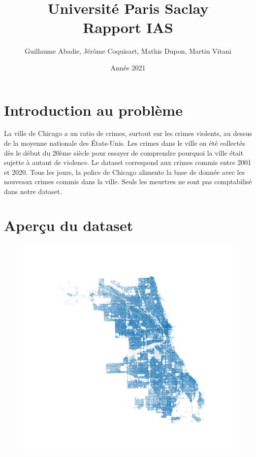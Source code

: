 \documentclass{article}
\title{\textbf{\Huge  Université Paris Saclay}\\ Rapport IAS}
\author{Guillaume Abadie, Jérôme Coquisart, Mathis Dupon, Martin Vitani}
\date{Année 2021}
\begin{document}
    \maketitle
    \tableofcontents
    \newpage


    \section{Introduction au problème}
    La ville de Chicago a un ratio de crimes, surtout sur les crimes violents, au dessus de la moyenne
    nationale des États-Unis.
    Les crimes dans le ville on été collectés dès le début du 20ème siècle pour essayer de 
    comprendre pourquoi la ville était sujette à autant de violence.
    Le dataset correspond aux crimes commis entre 2001 et 2020.
    Tous les jours, la police de Chicago alimente la base de donnée avec les nouveaux crimes commis
    dans la ville. Seuls les meurtres ne sont pas comptabilisé dans notre dataset.

    \section{Aperçu du dataset}
    \begin{figure}[H]
            \centering
	    \includegraphics[scale=.2]{carte_chicago.png}
    \end{figure}
\end{document}
